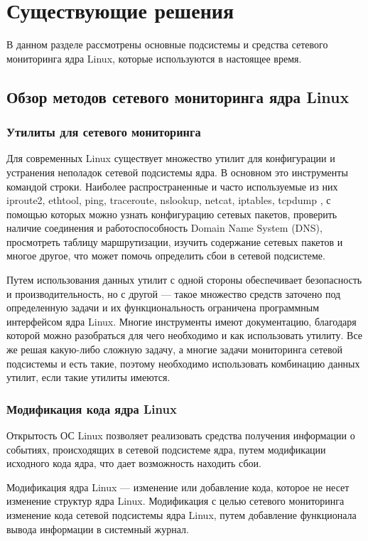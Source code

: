 \section{Существующие решения}

В данном разделе рассмотрены основные подсистемы и средства сетевого мониторинга ядра Linux, которые используются в настоящее время.

\subsection[Обзор средств сетевого мониторинга ядра Linux]{Обзор методов сетевого мониторинга ядра Linux}

\subsubsection{Утилиты для сетевого мониторинга}
Для современных Linux существует множество утилит для конфигурации и устранения неполадок сетевой подсистемы ядра. 
В основном это инструменты командой строки.  
Наиболее распространенные и часто используемые из них iproute2, ethtool, ping, traceroute, nslookup, netcat, iptables, tcpdump \cite{tcpip_craig}, с помощью которых можно узнать конфигурацию сетевых пакетов, проверить наличие соединения и работоспособность Domain Name System (DNS), просмотреть таблицу маршрутизации, изучить содержание сетевых пакетов и многое другое, что может помочь определить сбои в сетевой подсистеме.

Путем использования данных утилит с одной стороны обеспечивает безопасность и производительность, но с другой --- такое множество средств заточено под определенную задачи и их функциональность ограничена программным интерфейсом ядра Linux.
Многие инструменты имеют документацию, благодаря которой можно разобраться для чего необходимо и как использовать утилиту. 
Все же решая какую-либо сложную задачу, а многие задачи мониторинга сетевой подсистемы и есть такие, поэтому необходимо использовать комбинацию данных утилит, если такие утилиты имеются.

\subsubsection{Модификация кода ядра Linux}
Открытость ОС Linux позволяет реализовать средства получения информации о событиях, происходящих в сетевой подсистеме ядра, путем модификации исходного кода ядра, что дает возможность находить сбои.

Модификация ядра Linux --- изменение или добавление кода, которое не несет изменение структур ядра Linux. Модификация с целью сетевого мониторинга изменение кода сетевой подсистемы ядра Linux, путем добавление функционала вывода информации в системный журнал.~\cite{linux_network_implementation}


